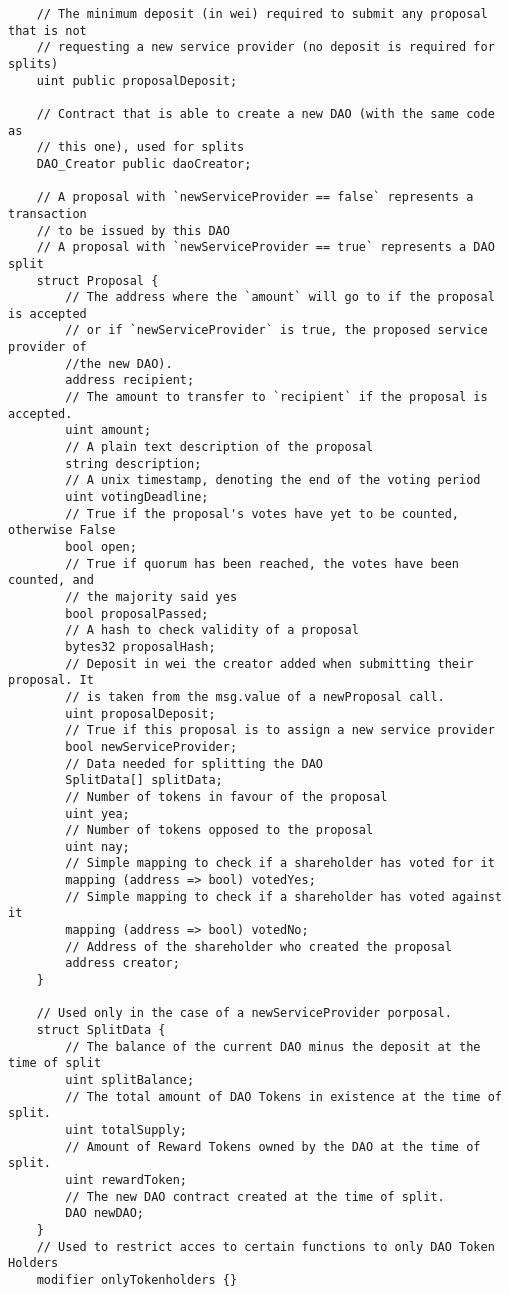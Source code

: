 \documentclass[9pt,oneside]{amsart}
\begin{document}
\begin{appendix}
\begin{verbatim}
    // The minimum deposit (in wei) required to submit any proposal that is not
    // requesting a new service provider (no deposit is required for splits)
    uint public proposalDeposit;

    // Contract that is able to create a new DAO (with the same code as
    // this one), used for splits
    DAO_Creator public daoCreator;

    // A proposal with `newServiceProvider == false` represents a transaction
    // to be issued by this DAO
    // A proposal with `newServiceProvider == true` represents a DAO split
    struct Proposal {
        // The address where the `amount` will go to if the proposal is accepted
        // or if `newServiceProvider` is true, the proposed service provider of
        //the new DAO).
        address recipient;
        // The amount to transfer to `recipient` if the proposal is accepted.
        uint amount;
        // A plain text description of the proposal
        string description;
        // A unix timestamp, denoting the end of the voting period
        uint votingDeadline;
        // True if the proposal's votes have yet to be counted, otherwise False
        bool open;
        // True if quorum has been reached, the votes have been counted, and
        // the majority said yes
        bool proposalPassed;
        // A hash to check validity of a proposal
        bytes32 proposalHash;
        // Deposit in wei the creator added when submitting their proposal. It
        // is taken from the msg.value of a newProposal call.
        uint proposalDeposit;
        // True if this proposal is to assign a new service provider
        bool newServiceProvider;
        // Data needed for splitting the DAO
        SplitData[] splitData;
        // Number of tokens in favour of the proposal
        uint yea;
        // Number of tokens opposed to the proposal
        uint nay;
        // Simple mapping to check if a shareholder has voted for it
        mapping (address => bool) votedYes;
        // Simple mapping to check if a shareholder has voted against it
        mapping (address => bool) votedNo;
        // Address of the shareholder who created the proposal
        address creator;
    }

    // Used only in the case of a newServiceProvider porposal.
    struct SplitData {
        // The balance of the current DAO minus the deposit at the time of split
        uint splitBalance;
        // The total amount of DAO Tokens in existence at the time of split.
        uint totalSupply;
        // Amount of Reward Tokens owned by the DAO at the time of split.
        uint rewardToken;
        // The new DAO contract created at the time of split.
        DAO newDAO;
    }
    // Used to restrict acces to certain functions to only DAO Token Holders
    modifier onlyTokenholders {}


\end{verbatim}
\end{appendix}
\end{document}
